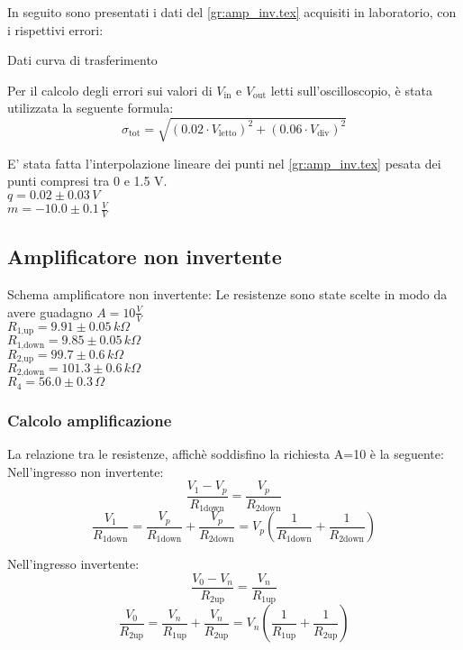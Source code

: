 In seguito sono presentati i dati del  \autoref{gr:amp_inv.tex} acquisiti in laboratorio, con i rispettivi errori:
\begin{tabella}
 \centering
  
 \caption{Dati curva di trasferimento}
 \label{tab:tab_inv.tex}
\end{tabella}

Per il calcolo degli errori sui valori di $V_\textrm{in}$ e $V_\textrm{out}$ letti sull'oscilloscopio, è stata utilizzata la seguente formula:
$$\sigma_\textrm{tot}=\sqrt{ (0.02\cdot V_\textrm{letto})^2 + (0.06 \cdot V_\textrm{div})^2}$$

E' stata fatta l'interpolazione lineare dei punti nel \autoref{gr:amp_inv.tex} pesata dei punti compresi tra 0 e 1.5 V.\\
$q = 0.02 \pm 0.03 \,V$\\
$m = -10.0 \pm 0.1 \, \frac{V}{V}$




\subsection{Amplificatore non invertente}

Schema amplificatore non invertente:
Le resistenze sono state scelte in modo da avere guadagno $A=10 \frac{V}{V}$\\
$R_\textrm{1,up}=9.91 \pm0.05 \,k\Omega $\\ %
$R_\textrm{1,down}=9.85 \pm 0.05\,k\Omega$\\ %
$R_\textrm{2,up}=99.7 \pm 0.6\,k\Omega$\\ %
$R_\textrm{2,down}=101.3 \pm 0.6\,k\Omega$\\
$R_4=56.0 \pm 0.3\,\Omega$

\subsubsection{Calcolo amplificazione}
La relazione tra le resistenze, affichè soddisfino la richiesta A=10 è la seguente:
Nell'ingresso non invertente:
$$\frac{V_1-V_p}{R_\textrm{1down}}=\frac{V_p}{R_\textrm{2down}}$$
$$\frac{V_1}{R_\textrm{1down}}=\frac{V_p}{R_\textrm{1down}}+\frac{V_p}{R_\textrm{2down}}=V_p \left(\frac{1}{R_\textrm{1down}}+\frac{1}{R_\textrm{2down}}\right)$$

Nell'ingresso invertente:
$$\frac{V_0-V_n}{R_\textrm{2up}}=\frac{V_n}{R_\textrm{1up}}$$
$$\frac{V_0}{R_\textrm{2up}}=\frac{V_n}{R_\textrm{1up}}+\frac{V_n}{R_\textrm{2up}}=V_n \left(\frac{1}{R_\textrm{1up}}+\frac{1}{R_\textrm{2up}}\right)$$

